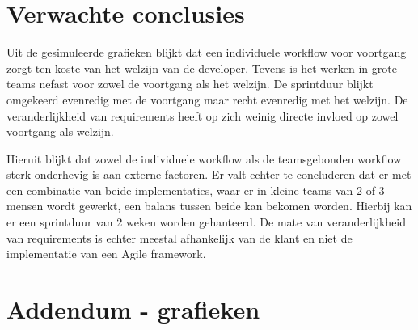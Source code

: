 \section{Verwachte conclusies}
\label{sec:verwachte_conclusies}
    Uit de gesimuleerde grafieken blijkt dat een individuele workflow voor voortgang zorgt ten koste van het welzijn van de developer. Tevens is het werken in grote teams nefast voor zowel de voortgang als het welzijn. De sprintduur blijkt omgekeerd evenredig met de voortgang maar recht evenredig met het welzijn. De veranderlijkheid van requirements heeft op zich weinig directe invloed op zowel voortgang als welzijn.
    
    Hieruit blijkt dat zowel de individuele workflow als de teamsgebonden workflow sterk onderhevig is aan externe factoren. Er valt echter te concluderen dat er met een combinatie van beide implementaties, waar er in kleine teams van 2 of 3 mensen wordt gewerkt, een balans tussen beide kan bekomen worden. Hierbij kan er een sprintduur van 2 weken worden gehanteerd. De mate van veranderlijkheid van requirements is echter meestal afhankelijk van de klant en niet de implementatie van een Agile framework.


\section{Addendum - grafieken}

